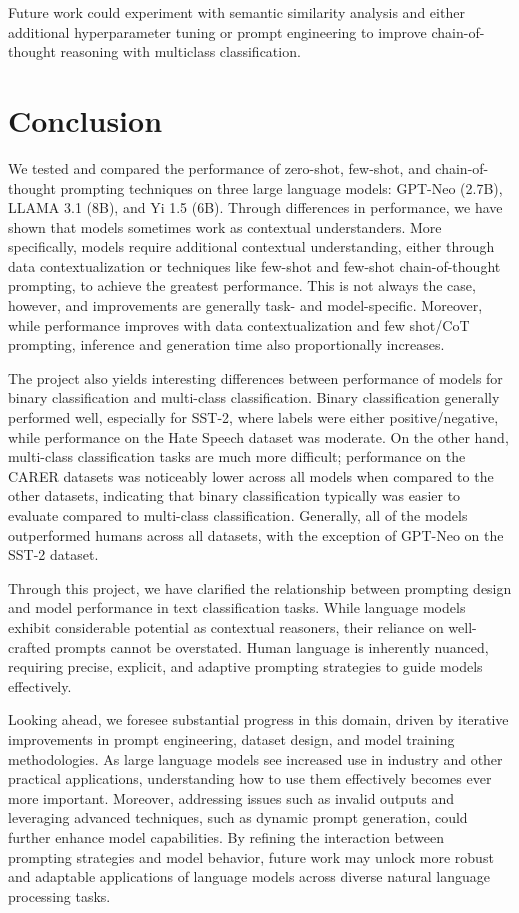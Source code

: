 \documentclass[twocolumn]{article}
\begin{document}
Future work could experiment with semantic similarity analysis and either additional hyperparameter tuning or prompt engineering to improve chain-of-thought reasoning with multiclass classification.


\section{Conclusion}

We tested and compared the performance of zero-shot, few-shot, and chain-of-thought prompting techniques on three large language models: GPT-Neo (2.7B), LLAMA 3.1 (8B), and Yi 1.5 (6B). Through differences in performance, we have shown that models sometimes work as contextual understanders. More specifically, models require additional contextual understanding, either through data contextualization or techniques like few-shot and few-shot chain-of-thought prompting, to achieve the greatest performance. This is not always the case, however, and improvements are generally task- and model-specific. Moreover, while performance improves with data contextualization and few shot/CoT prompting, inference and generation time also proportionally increases.

The project also yields interesting differences between performance of models for binary classification and multi-class classification. Binary classification generally performed well, especially for SST-2, where labels were either positive/negative, while performance on the Hate Speech dataset was moderate. On the other hand, multi-class classification tasks are much more difficult; performance on the CARER datasets was noticeably lower across all models when compared to the other datasets, indicating that binary classification typically was easier to evaluate compared to multi-class classification. Generally, all of the models outperformed humans across all datasets, with the exception of GPT-Neo on the SST-2 dataset.

Through this project, we have clarified the relationship between prompting design and model performance in text classification tasks. While language models exhibit considerable potential as contextual reasoners, their reliance on well-crafted prompts cannot be overstated. Human language is inherently nuanced, requiring precise, explicit, and adaptive prompting strategies to guide models effectively.

Looking ahead, we foresee substantial progress in this domain, driven by iterative improvements in prompt engineering, dataset design, and model training methodologies. As large language models see increased use in industry and other practical applications, understanding how to use them effectively becomes ever more important. Moreover, addressing issues such as invalid outputs and leveraging advanced techniques, such as dynamic prompt generation, could further enhance model capabilities. By refining the interaction between prompting strategies and model behavior, future work may unlock more robust and adaptable applications of language models across diverse natural language processing tasks.
\end{document}

